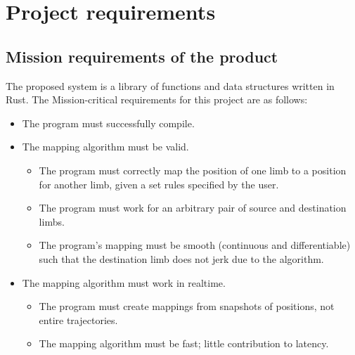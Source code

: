 \chapter{Project requirements}
\label{ch:project_requirements}

\section{Mission requirements of the product}
\label{sec:mission_requirements}
The proposed system is a library of functions and data structures written in Rust. The Mission-critical requirements for this project are as follows:
\begin{itemize}
    \item The program must successfully compile.
    \item The mapping algorithm must be valid.
    \begin{itemize}
        \item The program must correctly map the position of one limb to a position for another limb, given a set rules specified by the user.
        \item The program must work for an arbitrary pair of source and destination limbs.
        \item The program's mapping must be smooth (continuous and differentiable) such that the destination limb does not jerk due to the algorithm.
    \end{itemize}
    \item The mapping algorithm must work in realtime.
    \begin{itemize}
       \item The program must create mappings from snapshots of positions, not entire trajectories.
       \item The mapping algorithm must be fast; little contribution to latency.
    \end{itemize}
\end{itemize}


